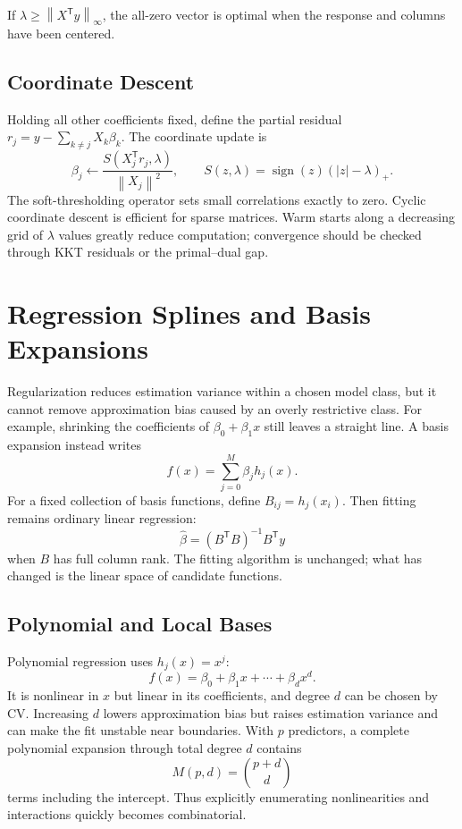 \documentclass[12pt,oneside]{book}
\numberwithin{equation}{section}
\theoremstyle{definition}
\theoremstyle{plain}
\theoremstyle{remark}
\newcommand{\norm}[1]{\left\lVert #1 \right\rVert}
\newcommand{\abs}[1]{\left\lvert #1 \right\rvert}
\begin{document}
If $\lambda\geq\norm{X^\mathsf Ty}_\infty$, the all-zero vector is optimal
when the response and columns have been centered.

\subsection{Coordinate Descent}

Holding all other coefficients fixed, define the partial residual
$r_j=y-\sum_{k\neq j}X_k\beta_k$. The coordinate update is
\begin{equation}
 \beta_j\leftarrow
 \frac{S(X_j^\mathsf Tr_j,\lambda)}{\norm{X_j}^2},
 \qquad
 S(z,\lambda)=\operatorname{sign}(z)(\abs z-\lambda)_+.
 \label{eq:lasso-coordinate}
\end{equation}
The soft-thresholding operator sets small correlations exactly to zero.
Cyclic coordinate descent is efficient for sparse matrices. Warm starts along
a decreasing grid of $\lambda$ values greatly reduce computation; convergence
should be checked through KKT residuals or the primal--dual gap.

\section{Regression Splines and Basis Expansions}

Regularization reduces estimation variance within a chosen model class, but it
cannot remove approximation bias caused by an overly restrictive class. For
example, shrinking the coefficients of $\beta_0+\beta_1x$ still leaves a
straight line. A basis expansion instead writes
\[
 f(x)=\sum_{j=0}^M\beta_jh_j(x).
\]
For a fixed collection of basis functions, define $B_{ij}=h_j(x_i)$. Then
fitting remains ordinary linear regression:
\[
 \widehat\beta=(B^\mathsf TB)^{-1}B^\mathsf Ty
\]
when $B$ has full column rank. The fitting algorithm is unchanged; what has
changed is the linear space of candidate functions.

\subsection{Polynomial and Local Bases}

Polynomial regression uses $h_j(x)=x^j$:
\[
 f(x)=\beta_0+\beta_1x+\cdots+\beta_dx^d.
\]
It is nonlinear in $x$ but linear in its coefficients, and degree $d$ can be
chosen by CV. Increasing $d$ lowers approximation bias but raises estimation
variance and can make the fit unstable near boundaries. With $p$ predictors,
a complete polynomial expansion through total degree $d$ contains
\[
 M(p,d)=\binom{p+d}{d}
\]
terms including the intercept. Thus explicitly enumerating nonlinearities and
interactions quickly becomes combinatorial.
\end{document}
